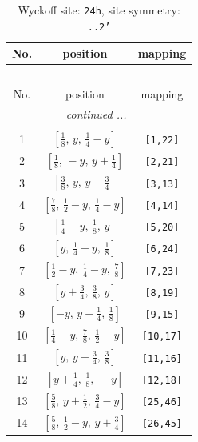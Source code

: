 \documentclass[fleqn,8pt]{jsarticle}
\begin{document}
\begin{longtable}{ccc}
\caption{Wyckoff site: {\tt 24h}, site symmetry: {\tt ..2'}}
 \\
 \hline \hline
No. & position & mapping \\ \hline \endfirsthead

\multicolumn{2}{l}{\tablename\ \thetable{}} \\
 \hline \hline
No. & position & mapping \\ \hline \endhead

 \hline \hline
\multicolumn{2}{r}{\footnotesize\it continued ...} \\ \endfoot

 \hline \hline
\multicolumn{2}{r}{} \\ \endlastfoot

1 & $\left[ \frac{1}{8},\, y,\, \frac{1}{4} - y \right]$ & {\tt [1,22]} \\ \hline
2 & $\left[ \frac{1}{8},\, - y,\, y + \frac{1}{4} \right]$ & {\tt [2,21]} \\ \hline
3 & $\left[ \frac{3}{8},\, y,\, y + \frac{3}{4} \right]$ & {\tt [3,13]} \\ \hline
4 & $\left[ \frac{7}{8},\, \frac{1}{2} - y,\, \frac{1}{4} - y \right]$ & {\tt [4,14]} \\ \hline
5 & $\left[ \frac{1}{4} - y,\, \frac{1}{8},\, y \right]$ & {\tt [5,20]} \\ \hline
6 & $\left[ y,\, \frac{1}{4} - y,\, \frac{1}{8} \right]$ & {\tt [6,24]} \\ \hline
7 & $\left[ \frac{1}{2} - y,\, \frac{1}{4} - y,\, \frac{7}{8} \right]$ & {\tt [7,23]} \\ \hline
8 & $\left[ y + \frac{3}{4},\, \frac{3}{8},\, y \right]$ & {\tt [8,19]} \\ \hline
9 & $\left[ - y,\, y + \frac{1}{4},\, \frac{1}{8} \right]$ & {\tt [9,15]} \\ \hline
10 & $\left[ \frac{1}{4} - y,\, \frac{7}{8},\, \frac{1}{2} - y \right]$ & {\tt [10,17]} \\ \hline
11 & $\left[ y,\, y + \frac{3}{4},\, \frac{3}{8} \right]$ & {\tt [11,16]} \\ \hline
12 & $\left[ y + \frac{1}{4},\, \frac{1}{8},\, - y \right]$ & {\tt [12,18]} \\ \hline
13 & $\left[ \frac{5}{8},\, y + \frac{1}{2},\, \frac{3}{4} - y \right]$ & {\tt [25,46]} \\ \hline
14 & $\left[ \frac{5}{8},\, \frac{1}{2} - y,\, y + \frac{3}{4} \right]$ & {\tt [26,45]} \\ \hline

\end{longtable}
\end{document}
